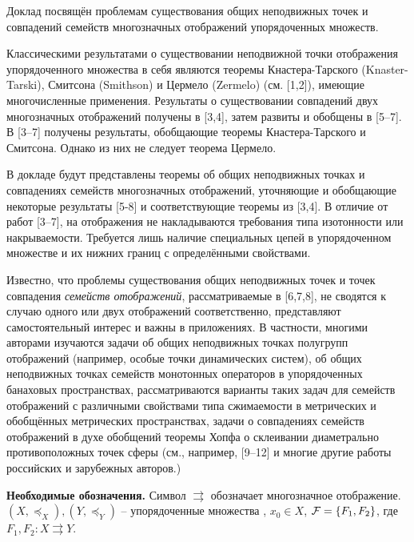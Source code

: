 


\vzmscaption

Доклад посвящён проблемам существования общих неподвижных точек и совпадений семейств многозначных отображений упорядоченных множеств.

Классическими результатами о существовании неподвижной точки отображения упорядоченного множества в себя являются теоремы Кна\-стера-Тарского (Knaster-Tarski), Смитсона (Smithson) и Цермело (Zer\-melo) (см. [1,2]), имеющие многочисленные применения. Результаты о существовании совпадений двух многозначных отображений получены в [3,4], затем развиты и обобщены  в [5--7]. В  [3--7] получены результаты, обобщающие теоремы Кнастера-Тарского и Смитсона. Однако из них не следует теорема Цермело.

В докладе будут представлены теоремы об общих неподвижных точках и совпадениях семейств многозначных отображений, уточняющие и обобщающие некоторые результаты [5-8] и  соответствующие теоремы из [3,4]. В отличие от  работ [3--7],  на отображения не накладываются требования типа изотонности или накрываемости. Требуется лишь наличие специальных цепей в упорядоченном множестве и их нижних границ с определёнными свойствами.

Известно, что проблемы существования  общих неподвижных точек и точек совпадения {\it семейств отображений}, рассматриваемые в [6,7,8],  не сводятся к случаю  одного или двух отображений соответственно, представляют самостоятельный интерес и важны в приложениях. В частности, многими авторами изучаются задачи об общих неподвижных точках  полугрупп отображений (например, особые точки динамических систем), об общих неподвижных точках семейств  монотонных операторов в упорядоченных банаховых пространствах, рассматриваются  варианты таких задач для семейств отображений с различными свойствами типа сжимаемости в метрических и обобщённых метрических пространствах, задачи о совпадениях семейств отображений в духе обобщений теоремы Хопфа о склеивании диаметрально противоположных точек сферы (см., например,  [9--12] и многие другие работы российских и зарубежных авторов.)

{\bf Необходимые обозначения.} Сим\-вол  $\rightrightarrows$  обозначает многозначное отображение. $(X,\preceq_{X}), (Y,\preceq_{Y})$ -- упорядоченные множества , $x_{0}\in X$, ${\cal F}=\{F_{1},F_{2}\}$, где
$F_{1},F_{2}: X\rightrightarrows Y$.

